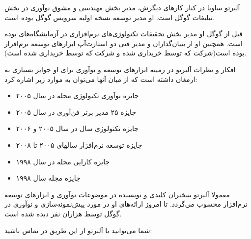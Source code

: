 آلبرتو ساویا در کنار کارهای دیگرش، مدیر بخش مهندسی و مشوق نوآوری در بخش
تبلیغات گوگل است. او مدیر توسعه نسخه اولیه سرویس  گوگل بوده
است.

قبل از گوگل او مدیر بخش تحقیقات تکنولوژی‌های نرم‌افزاری در آزمایشگاه‌های
  بوده است. همچنین او از بنیان‌گذاران و مدیر
فنی دو استارت‌آپ ابزارهای توسعه نرم‌افزار بوده است(شرکت  که
توسط   خریداری شده و شرکت 
 که توسط  خریداری شده است).

افکار و نظرات آلبرتو در زمینه ابزارهای توسعه و نوآوری برای او جوایز
بسیاری به ارمغان داشته است که از میان آنها می‌توان به موارد زیر اشاره
کرد:

\begin{itemize}

\item
  جایزه نوآوری تکنولوژی مجله    
  در سال ۲۰۰۵
\item
  جایزه ۲۵ مدیر برتر فن‌آوری  در سال ۲۰۰۵
\item
  جایزه تکنولوژی سال  در سال ۲۰۰۵ و ۲۰۰۶
\item
  جایزه توسعه نرم‌افزار  سالهای ۲۰۰۵ تا ۲۰۰۸
\item
  جایزه کارایی مجله   در سال ۱۹۹۸
\item
  جایزه   مجله   سال ۱۹۹۸
\end{itemize}

معمولا آلبرتو سخنران کلیدی و نویسنده در موضوعات نوآوری و ابزارهای توسعه
نرم‌افزار محسوب می‌گردد. تا امروز ارائه‌های او در مورد پیش‌نمونه‌سازی و
نوآوری در گوگل توسط هزاران نفر دیده شده است.

شما می‌توانید با آلبرتو از این طریق در تماس باشید:
